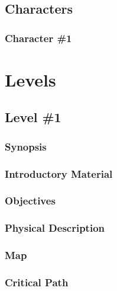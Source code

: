\documentclass[12pt,titlepage]{article}
\begin{document}

\subsection{Characters}

\subsubsection{Character \#1}


\newpage
\section{Levels}

\subsection{Level \#1}

\subsubsection{Synopsis}

\subsubsection{Introductory Material}

\subsubsection{Objectives}

\subsubsection{Physical Description}

\subsubsection{Map}

\subsubsection{Critical Path}
\end{document}
